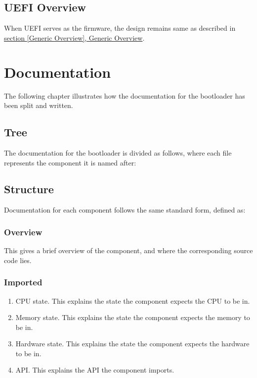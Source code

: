\documentclass[a4paper,oneside]{memoir}
\begin{document}
\section{UEFI Overview}

When UEFI serves as the firmware, the design remains same as described in \hyperref[Generic Overview]{section \ref*{Generic Overview}, Generic Overview}.

\chapter{Documentation}

The following chapter illustrates how the documentation for the bootloader has been split and written.

\section{Tree}

The documentation for the bootloader is divided as follows, where each file represents the component it is named after:\\


\section{Structure}

Documentation for each component follows the same standard form, defined as:

\subsection{Overview}

This gives a brief overview of the component, and where the corresponding source code lies.

\subsection{Imported}

\begin{enumerate}
    \item CPU state. This explains the state the component expects the CPU to be in.
    \item Memory state. This explains the state the component expects the memory to be in.
    \item Hardware state. This explains the state the component expects the hardware to be in.
    \item API. This explains the API the component imports.
\end{enumerate}
\end{document}
